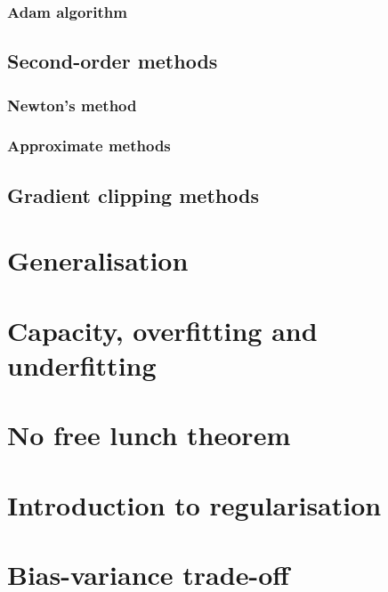 \subsubsection{Adam algorithm}

\subsection{Second-order methods}

\subsubsection{Newton's method}

\subsubsection{Approximate methods}


\subsection{Gradient clipping methods}


\section{Generalisation}


\section{Capacity, overfitting and underfitting}



\section{No free lunch theorem}


\section{Introduction to regularisation}


\section{Bias-variance trade-off}







